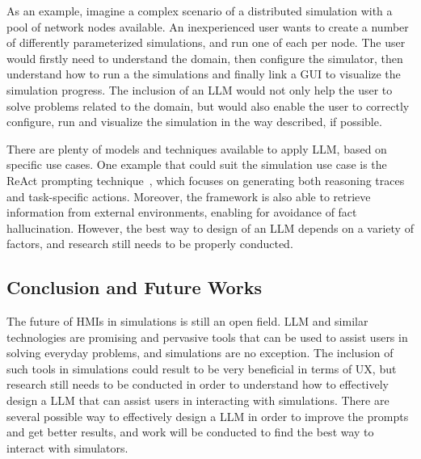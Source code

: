 \documentclass[conference]{IEEEtran}
\begin{document}
As an example,
imagine a complex scenario of a distributed simulation with a pool of network nodes available.
%
An inexperienced user wants to create a number of differently parameterized simulations,
and run one of each per node.
%
The user would firstly need to understand the domain,
then configure the simulator,
then understand how to run a the simulations and finally link a \ac{GUI} to visualize the simulation progress.
%
The inclusion of an \ac{LLM} would not only help the user to solve problems related to the domain,
but would also enable the user to correctly configure, run and visualize the simulation in the way described,
if possible.
%

There are plenty of models and techniques available to apply \ac{LLM},
based on specific use cases.
%
One example that could suit the simulation use case is the ReAct prompting technique~\cite{DBLP:conf/iclr/YaoZYDSN023},
which focuses on generating both reasoning traces and task-specific actions.
%
Moreover,
the framework is also able to retrieve information from external environments,
enabling for avoidance of fact hallucination.
%
However,
the best way to design of an \ac{LLM} depends on a variety of factors,
and research still needs to be properly conducted.

\subsection{Conclusion and Future Works}
%
The future of \acp{HMI} in simulations is still an open field.
%
\ac{LLM} and similar technologies are promising and pervasive tools that can be used to assist users in solving everyday problems,
and simulations are no exception.
%
The inclusion of such tools in simulations could result to be very beneficial in terms of \ac{UX},
but research still needs to be conducted in order to understand how to effectively design a \ac{LLM} that can assist users in interacting with simulations.
%
There are several possible way to effectively design a \ac{LLM} in order to improve the prompts and get better results,
and work will be conducted to find the best way to interact with simulators.



\vspace{12pt}
\end{document}
